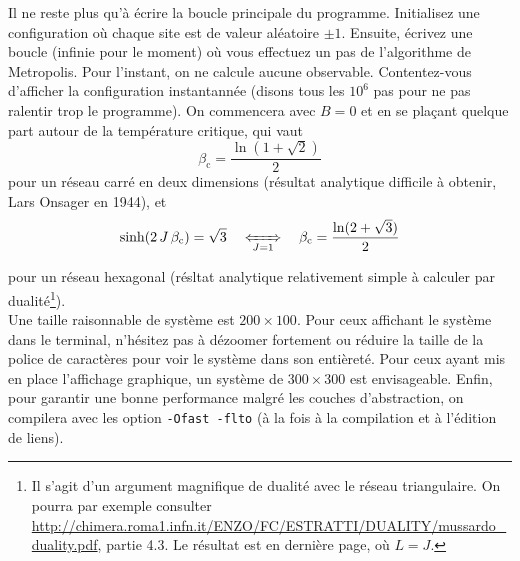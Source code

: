 \documentclass{book}
\newcommand{\inline}[1]{\texttt{#1}}
\begin{document}
Il ne reste plus qu'à écrire la boucle principale du programme. Initialisez une configuration où chaque site est de valeur aléatoire $\pm 1$. Ensuite, écrivez une boucle (infinie pour le moment) où vous effectuez un pas de l'algorithme de Metropolis. Pour l'instant, on ne calcule aucune observable. Contentez-vous d'afficher la configuration instantannée (disons tous les $10^6$ pas pour ne pas ralentir trop le programme). On commencera avec $B=0$ et en se plaçant quelque part autour de la température critique, qui vaut
\begin{equation}
\beta_\text{c} = \frac{\ln(1+\sqrt{2})}{2}
\end{equation}
pour un réseau carré en deux dimensions (résultat analytique difficile à obtenir, Lars Onsager en 1944), et
\begin{equation}
\sinh(2\,J\,\beta_\text{c})=\sqrt{3} \quad \xLeftrightarrow[J=1]{} \quad \beta_\text{c} = \frac{\ln(2+\sqrt{3})}{2}
\end{equation}

 pour un réseau hexagonal (résltat analytique relativement simple à calculer par dualité\footnote{Il s'agit d'un argument magnifique de dualité avec le réseau triangulaire. On pourra par exemple consulter \url{http://chimera.roma1.infn.it/ENZO/FC/ESTRATTI/DUALITY/mussardo_duality.pdf}, partie 4.3. Le résultat est en dernière page, où $L=J$.}).\\

 Une taille raisonnable de système est $200 \times 100$. Pour ceux affichant le système dans le terminal, n'hésitez pas à dézoomer fortement ou réduire la taille de la police de caractères pour voir le système dans son entièreté. Pour ceux ayant mis en place l'affichage graphique, un système de $300 \times 300$ est envisageable. Enfin, pour garantir une bonne performance malgré les couches d'abstraction, on compilera avec les option \inline{-Ofast -flto} (à la fois à la compilation et à l'édition de liens).\\
\end{document}
